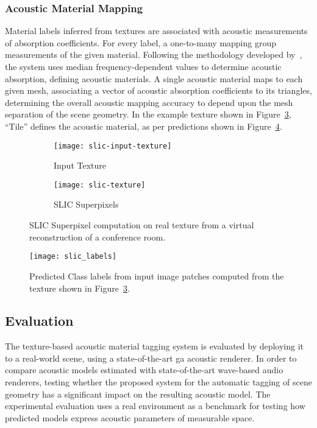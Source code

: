 \subsubsection{Acoustic Material Mapping}
Material labels inferred from textures are associated with acoustic measurements of absorption coefficients. For every label, a one-to-many mapping group measurements of the given material. Following the methodology developed by~\cite{kim2020acoustic}, the system uses median frequency-dependent values to determine acoustic absorption, defining acoustic materials. A single acoustic material maps to each given mesh, associating a vector of acoustic absorption coefficients to its triangles, determining the overall acoustic mapping accuracy to depend upon the mesh separation of the scene geometry. In the example texture shown in Figure~\ref{fig:slic-generation}, ``Tile'' defines the acoustic material, as per predictions shown in Figure~\ref{fig:slic-label-inference}.
\begin{figure}[htbp]
    \centering
    \begin{subfigure}[t]{0.49\textwidth}
       \centering
       \texttt{[image: slic-input-texture]}
       \caption{Input Texture}
       \label{fig:slic-input-texture}
    \end{subfigure}
    \begin{subfigure}[t]{0.49\textwidth}
       \centering
       \texttt{[image: slic-texture]}
       \caption{SLIC Superpixels}
       \label{fig:slic-labels}
    \end{subfigure}
\caption[SLIC superpixel computation on a texture]{SLIC Superpixel computation on real texture from a virtual reconstruction of a conference room.}
\label{fig:slic-generation}
\end{figure}%
\begin{figure}[htbp]
    \centering
    \texttt{[image: slic\_labels]}
    \caption[Superpixel algorithm used to generate image patches]{Predicted Class labels from input image patches computed from the texture shown in Figure~\ref{fig:slic-generation}.}
    \label{fig:slic-label-inference}
\end{figure}


\subsection{Evaluation}
The texture-based acoustic material tagging system is evaluated by deploying it to a real-world scene, using a state-of-the-art \acrshort{ga} acoustic renderer. In order to compare acoustic models estimated with state-of-the-art wave-based audio renderers, testing whether the proposed system for the automatic tagging of scene geometry has a significant impact on the resulting acoustic model. The experimental evaluation uses a real environment as a benchmark for testing how predicted models express acoustic parameters of measurable space.

